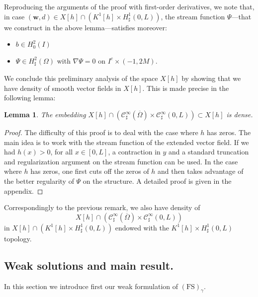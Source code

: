 \documentclass[10pt]{amsart}
\let\mathcal\mathscr
\newcommand{\FS}{\mathrm{FS}}
\newtheorem{lemma}[theorem]{Lemma}
\theoremstyle{remark}
\theoremstyle{definition}
\newcommand{\wg}{\boldsymbol{w}}
\let\CM\Omega
\begin{document}
Reproducing the arguments of the proof with first-order derivatives, we note that, in case $(\wg,d) \in X[h] \cap (K^1[h] \times H^1_{\sharp}(0,L))$, the stream function $\Psi$---that we construct in the above lemma---satisfies moreover:\enlargethispage{.5\baselineskip}%
\begin{itemize}
\item $ b \in H^2_0(I)$
\item $ \Psi \in H^2_{\sharp}(\Omega)$ with $\nabla \Psi = 0$ on $I^c \times (-1,2M)$.
\end{itemize}
We conclude this preliminary analysis of the space $X[h]$
by showing that we have density of smooth vector fields in
$X[h]$. This is made precise in the following lemma:

\begin{lemma}\label{lemma.density}The embedding $X[h]\cap (\mathcal{C}_\sharp^{\infty}(\overline{\CM})\times\mathcal{C}_\sharp^{\infty}(0, L))\subset X[h]$ is dense.
\end{lemma}
\begin{proof}
The difficulty of this proof is to deal with the case where $h$ has zeros. The main idea is to work with the stream function
of the extended vector field. If we had $h(x)>0$, for all $x\in [0, L]$, a contraction in $y$ and a standard truncation and regularization argument on the stream function can be used. In the case where $h$ has zeros, one first cuts off the zeros of $h$ and then takes advantage of the better regularity of $\Psi$ on the structure. A detailed proof is given in the appendix.
\end{proof}

Correspondingly to the previous remark, we also have density of\vspace*{-3pt}
\[
X[h] \cap (\mathcal{C}_\sharp^{\infty}(\overline{\CM})\times\mathcal{C}_\sharp^{\infty}(0, L))
\]
in $X[h] \cap (K^1[h] \times H^1_{\sharp}(0,L))$ endowed with the $K^1[h] \times H^1_{\sharp}(0,L)$
topology.

\subsection{Weak solutions and main result.}

In this section we introduce first our weak formulation of $(\FS)_{\gamma}$.
\end{document}
